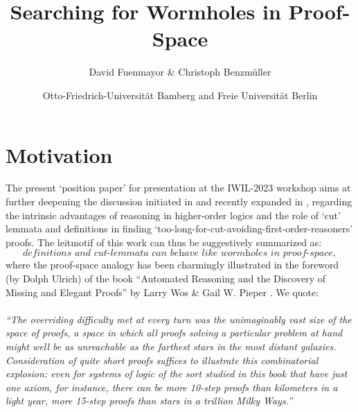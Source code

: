 \documentclass{article}
\title{Searching for Wormholes in Proof-Space}
\author{David Fuenmayor \& Christoph Benzmüller}
\date{\normalsize Otto-Friedrich-Universität Bamberg and Freie Universität Berlin}
\begin{document}
\maketitle

\section{Motivation}

The present `position paper' for presentation at the IWIL-2023 workshop aims at further deepening the discussion initiated in \cite{LostProof} and recently expanded in \cite{BCPpaper}, regarding the intrinsic advantages of reasoning in higher-order logics and the role of `cut' lemmata and definitions in finding `too-long-for-cut-avoiding-first-order-reasoners' proofs.
The leitmotif of this work can thus be suggestively summarized as:
$$\textit{definitions and cut-lemmata can behave like wormholes in proof-space},$$
where the proof-space analogy has been charmingly illustrated in the foreword (by Dolph Ulrich) of the book ``Automated Reasoning and the Discovery of Missing and Elegant Proofs'' by Larry Wos \& Gail W. Pieper \cite{wos2003automated}. We quote: 
\\ \\
\textit{``The overriding difficulty met at every turn was the unimaginably vast size of the space of proofs, a space in which all proofs solving a particular problem at hand might well be as unreachable as the farthest stars in the most distant galaxies. Consideration of quite short proofs suffices to illustrate this combinatorial explosion: even for systems of logic of the sort studied in this book that have just one axiom, for instance, there can be more 10-step proofs than kilometers in a light year, more 15-step proofs than stars in a trillion Milky Ways.''}
\\
\end{document}
